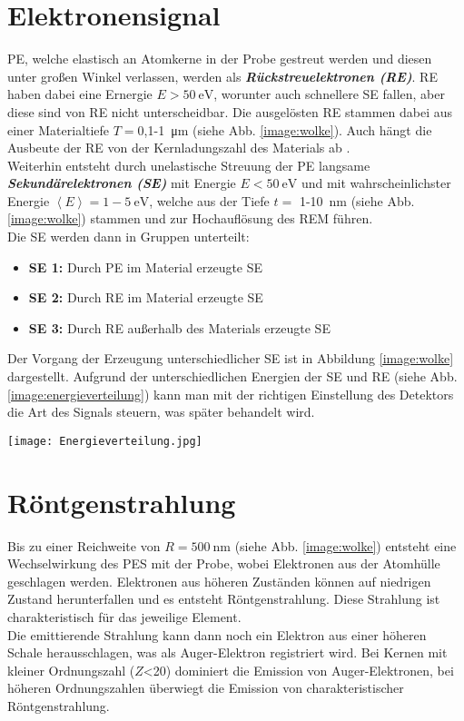 \section*{Elektronensignal}
PE, welche elastisch an Atomkerne in der Probe gestreut werden und diesen unter großen Winkel verlassen, werden als \textbf{\textit{Rückstreuelektronen (RE)}}. RE haben dabei eine Ernergie $E > \SI{50}{\electronvolt}$, worunter auch schnellere SE fallen, aber diese sind von RE nicht unterscheidbar. Die ausgelösten RE stammen dabei aus einer Materialtiefe $T=$0,1-\SI{1}{\micro\metre} (siehe Abb. \ref{image:wolke}). Auch hängt die Ausbeute der RE von der Kernladungszahl des Materials ab \citep{WikipolyREM}.\\
Weiterhin entsteht durch unelastische Streuung der PE langsame \textbf{\textit{Sekundärelektronen (SE)}} mit Energie $E < \SI{50}{\electronvolt}$ und mit wahrscheinlichster Energie $\left\langle E\right\rangle=1-\SI{5}{\electronvolt}$, welche aus der Tiefe $t =$ 1-\SI{10}{\nano\metre} (siehe Abb. \ref{image:wolke}) stammen und zur Hochauflösung des REM führen.\\
Die SE werden dann in Gruppen unterteilt:
\begin{itemize}
    \item \textbf{SE 1:} Durch PE im Material erzeugte SE
    \item \textbf{SE 2:} Durch RE im Material erzeugte SE 
    \item \textbf{SE 3:} Durch RE außerhalb des Materials erzeugte SE\\   
\end{itemize}
Der Vorgang der Erzeugung unterschiedlicher SE ist in Abbildung \ref{image:wolke} dargestellt. Aufgrund der unterschiedlichen Energien der SE und RE (siehe Abb. \ref{image:energieverteilung}) kann man mit der richtigen Einstellung des Detektors die Art des Signals steuern, was später behandelt wird.
\begin{SCfigure}[][h]
    \texttt{[image: Energieverteilung.jpg]}
    \caption{Schematische Energieverteilung der Anzahl von SE und RE bei normierter Energie \citep{RasterEM}}
    \label{image:energieverteilung}
\end{SCfigure}
\section*{Röntgenstrahlung}
Bis zu einer Reichweite von $R=\SI{500}{\nano\metre}$ (siehe Abb. \ref{image:wolke}) entsteht eine Wechselwirkung des PES mit der Probe, wobei Elektronen aus der Atomhülle geschlagen werden. Elektronen aus höheren Zuständen können auf niedrigen Zustand herunterfallen und es entsteht Röntgenstrahlung. Diese Strahlung ist charakteristisch für das jeweilige Element.\\Die emittierende Strahlung kann dann noch ein Elektron aus einer höheren Schale herausschlagen, was als Auger-Elektron registriert wird. Bei Kernen mit kleiner Ordnungszahl ($Z$<20) dominiert die Emission von Auger-Elektronen, bei höheren Ordnungszahlen überwiegt die Emission von charakteristischer Röntgenstrahlung.\\

